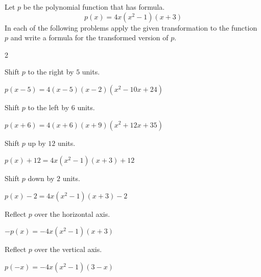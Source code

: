 \begin{exercises}
	 \begin{problem}
	 Let $p$ be the polynomial function that has formula.
	 \[
		 p(x)=4x(x^2-1)(x+3)
	 \]
	 In each of the following
	 problems apply the given transformation to the function $p$ and
	 write a formula for the transformed version of $p$.
	 \begin{multicols}{2}
		 \begin{subproblem}
			 Shift $p$ to the right by $5$ units.
			 \begin{shortsolution}
				 $p(x-5)=4(x-5)(x-2)(x^2-10x+24)$
			 \end{shortsolution}
		 \end{subproblem}
		 \begin{subproblem}
			 Shift $p$ to the left by $6$ units.
			 \begin{shortsolution}
				 $p(x+6)=4(x+6)(x+9)(x^2+12x+35)$
			 \end{shortsolution}
		 \end{subproblem}
		 \begin{subproblem}
			 Shift $p$ up by $12$ units.
			 \begin{shortsolution}
				 $p(x)+12=4x(x^2-1)(x+3)+12$
			 \end{shortsolution}
		 \end{subproblem}
		 \begin{subproblem}
			 Shift $p$ down by $2$ units.
			 \begin{shortsolution}
				 $p(x)-2=4x(x^2-1)(x+3)-2$
			 \end{shortsolution}
		 \end{subproblem}
		 \begin{subproblem}
			 Reflect $p$ over the horizontal axis.
			 \begin{shortsolution}
				 $-p(x)=-4x(x^2-1)(x+3)$
			 \end{shortsolution}
		 \end{subproblem}
		 \begin{subproblem}
			 Reflect $p$ over the vertical axis.
			 \begin{shortsolution}
				 $p(-x)=-4x(x^2-1)(3-x)$
			 \end{shortsolution}
		 \end{subproblem}
	 \end{multicols}
	 \end{problem}


\end{exercises}
